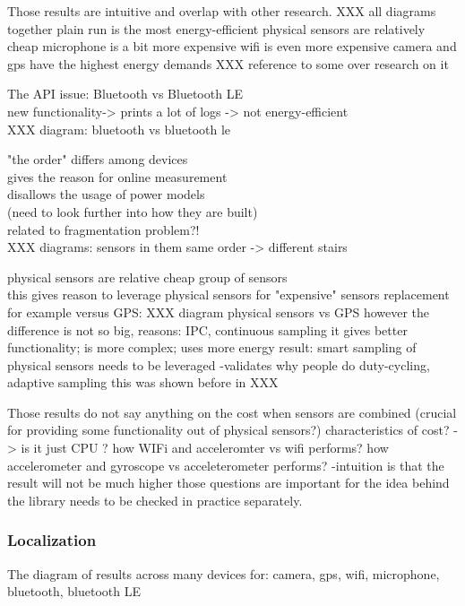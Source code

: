 Those results are intuitive and overlap with other research.
	XXX all diagrams together
	plain run is the most energy-efficient
	physical sensors are relatively cheap
	microphone is a bit more expensive 
	wifi is even more expensive
	camera and gps have the highest energy demands
	XXX reference to some over research on it
	

The API issue: Bluetooth vs Bluetooth LE\\
	new functionality-> prints a lot of logs -> not energy-efficient\\
	XXX diagram: bluetooth vs bluetooth le 	
				
"the order" differs among devices\\
	gives the reason for online measurement\\
	disallows the usage of power models\\
		(need to look further into how they are built)\\
		related to fragmentation problem?!\\
	XXX diagrams: sensors in them same order -> different stairs

physical sensors are relative cheap group of sensors \\
	this gives reason to leverage physical sensors for "expensive" sensors replacement
		for example versus GPS:
			XXX diagram physical sensors vs GPS
	however the difference is not so big,
		reasons: IPC, continuous sampling
			it gives better functionality; is more complex; uses more energy
		result: smart sampling of physical sensors needs to be leveraged
			-validates why people do duty-cycling, adaptive sampling
		this was shown before in XXX

Those results do not say anything on the cost when sensors are combined
		(crucial for providing some functionality out of physical sensors?)
		characteristics of cost? -> is it just CPU ?
			how WIFi and acceleromter vs wifi performs?
			how accelerometer and gyroscope vs acceleterometer performs?
				-intuition is that the result will not be much higher
			those questions are important for the idea behind  the library
				needs to be checked in practice separately.
		
		
\subsubsection{Localization}

The diagram of results across many devices for: camera, gps, wifi, microphone, bluetooth, bluetooth LE

